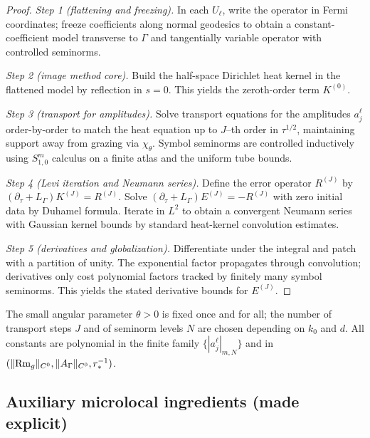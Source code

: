 \begin{proof}[Proof]
\emph{Step 1 (flattening and freezing).} In each $U_\ell$, write the operator in Fermi coordinates; freeze coefficients along normal geodesics to obtain a constant-coefficient model transverse to $\Gamma$ and tangentially variable operator with controlled seminorms.

\emph{Step 2 (image method core).} Build the half-space Dirichlet heat kernel in the flattened model by reflection in $s=0$. This yields the zeroth-order term $K^{(0)}$.

\emph{Step 3 (transport for amplitudes).} Solve transport equations for the amplitudes $a_j^\ell$ order-by-order to match the heat equation up to $J$–th order in $\tau^{1/2}$, maintaining support away from grazing via $\chi_\theta$. Symbol seminorms are controlled inductively using $S^m_{1,0}$ calculus on a finite atlas and the uniform tube bounds.

\emph{Step 4 (Levi iteration and Neumann series).} Define the error operator $R^{(J)}$ by $(\partial_\tau + L_\Gamma)K^{(J)} = R^{(J)}$. Solve $(\partial_\tau + L_\Gamma)E^{(J)} = -R^{(J)}$ with zero initial data by Duhamel formula. Iterate in $L^2$ to obtain a convergent Neumann series with Gaussian kernel bounds by standard heat-kernel convolution estimates.

\emph{Step 5 (derivatives and globalization).} Differentiate under the integral and patch with a partition of unity. The exponential factor propagates through convolution; derivatives only cost polynomial factors tracked by finitely many symbol seminorms. This yields the stated derivative bounds for $E^{(J)}$.
\end{proof}

\begin{remark}
The small angular parameter $\theta>0$ is fixed once and for all; the number of transport steps $J$ and of seminorm levels $N$ are chosen depending on $k_0$ and $d$. All constants are polynomial in the finite family $\{|a_j^\ell|_{m,N}\}$ and in $(\|{\rm Rm}_g\|_{C^0},\|A_\Gamma\|_{C^0},r_*^{-1})$.
\end{remark}

\subsection*{Auxiliary microlocal ingredients (made explicit)}
